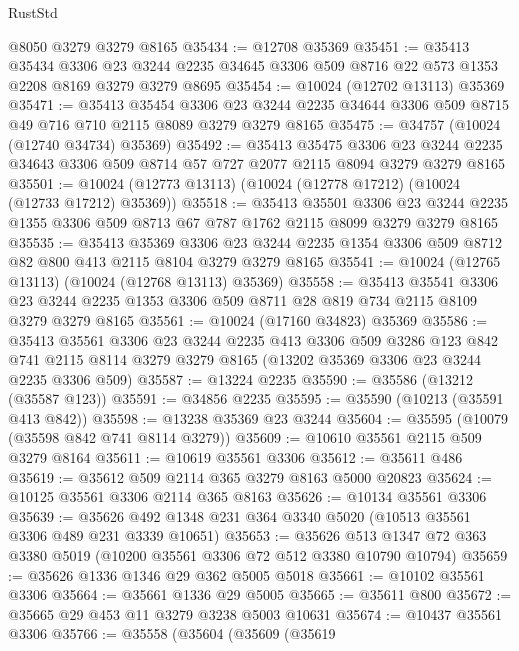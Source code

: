 \begin{lexlean}{RustStd}
\begin{coremodule}
    @8050
    @3279
    @3279
    @8165
@35434 := @12708 @35369
@35451 := @35413
    @35434
    @3306
    @23
    @3244
    @2235
    @34645
    @3306
    @509
    @8716
    @22
    @573
    @1353
    @2208
    @8169
    @3279
    @3279
    @8695
@35454 := @10024 (@12702 @13113) @35369
@35471 := @35413
    @35454
    @3306
    @23
    @3244
    @2235
    @34644
    @3306
    @509
    @8715
    @49
    @716
    @710
    @2115
    @8089
    @3279
    @3279
    @8165
@35475 := @34757 (@10024 (@12740 @34734) @35369)
@35492 := @35413
    @35475
    @3306
    @23
    @3244
    @2235
    @34643
    @3306
    @509
    @8714
    @57
    @727
    @2077
    @2115
    @8094
    @3279
    @3279
    @8165
@35501 := @10024 (@12773 @13113) (@10024 (@12778 @17212) (@10024 (@12733 @17212) @35369))
@35518 := @35413
    @35501
    @3306
    @23
    @3244
    @2235
    @1355
    @3306
    @509
    @8713
    @67
    @787
    @1762
    @2115
    @8099
    @3279
    @3279
    @8165
@35535 := @35413
    @35369
    @3306
    @23
    @3244
    @2235
    @1354
    @3306
    @509
    @8712
    @82
    @800
    @413
    @2115
    @8104
    @3279
    @3279
    @8165
@35541 := @10024 (@12765 @13113) (@10024 (@12768 @13113) @35369)
@35558 := @35413
    @35541
    @3306
    @23
    @3244
    @2235
    @1353
    @3306
    @509
    @8711
    @28
    @819
    @734
    @2115
    @8109
    @3279
    @3279
    @8165
@35561 := @10024 (@17160 @34823) @35369
@35586 := @35413
    @35561
    @3306
    @23
    @3244
    @2235
    @413
    @3306
    @509
    @3286
    @123
    @842
    @741
    @2115
    @8114
    @3279
    @3279
    @8165
    (@13202 @35369 @3306 @23 @3244 @2235 @3306 @509)
@35587 := @13224 @2235
@35590 := @35586 (@13212 (@35587 @123))
@35591 := @34856 @2235
@35595 := @35590 (@10213 (@35591 @413 @842))
@35598 := @13238 @35369 @23 @3244
@35604 := @35595 (@10079 (@35598 @842 @741 @8114 @3279))
@35609 := @10610 @35561 @2115 @509 @3279 @8164
@35611 := @10619 @35561 @3306
@35612 := @35611 @486
@35619 := @35612 @509 @2114 @365 @3279 @8163 @5000 @20823
@35624 := @10125 @35561 @3306 @2114 @365 @8163
@35626 := @10134 @35561 @3306
@35639 := @35626 @492 @1348 @231 @364 @3340 @5020 (@10513 @35561 @3306 @489 @231 @3339 @10651)
@35653 := @35626 @513 @1347 @72 @363 @3380 @5019 (@10200 @35561 @3306 @72 @512 @3380 @10790 @10794)
@35659 := @35626 @1336 @1346 @29 @362 @5005 @5018
@35661 := @10102 @35561 @3306
@35664 := @35661 @1336 @29 @5005
@35665 := @35611 @800
@35672 := @35665 @29 @453 @11 @3279 @3238 @5003 @10631
@35674 := @10437 @35561 @3306
@35766 := @35558
    (@35604
      (@35609
        (@35619

\end{coremodule}
\end{lexlean}
